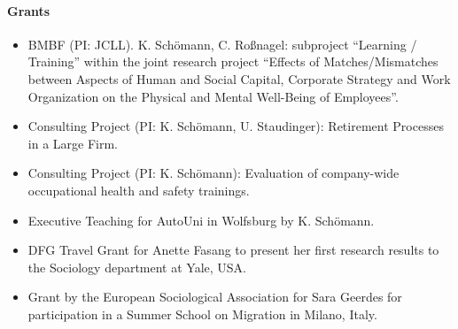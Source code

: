 \paragraph{Grants}
\begin{itemize}
\item BMBF (PI: JCLL). K. Sch\"omann, C. Ro\ss nagel: subproject ``Learning / Training'' within the joint research project ``Effects of Matches/Mismatches between Aspects of Human and Social Capital, Corporate Strategy and Work Organization on the Physical and Mental Well-Being of Employees''. 
\item Consulting Project (PI: K. Sch\"omann, U. Staudinger): Retirement Processes in a Large Firm.
\item Consulting Project (PI: K. Sch\"omann): Evaluation of company-wide occupational health and safety trainings.
\item Executive Teaching for AutoUni in Wolfsburg by K. Sch\"omann.
\item DFG Travel Grant for Anette Fasang to present her first research results to the Sociology department at Yale, USA.
\item Grant by the European Sociological Association for Sara Geerdes for participation in a Summer School on Migration in Milano, Italy.
\end{itemize}